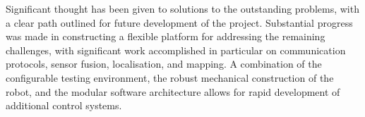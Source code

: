 Significant thought has been given to solutions to the outstanding problems, with
a clear path outlined for future development of the project. Substantial progress
was made in constructing a flexible platform for addressing the remaining
challenges, with significant work accomplished in particular on communication
protocols, sensor fusion, localisation, and mapping.
A combination of the configurable testing environment, the robust mechanical
construction of the robot, and the modular software architecture allows for rapid
development of additional control systems.
